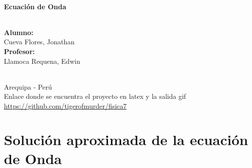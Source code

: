 \documentclass{article}
\begin{document}
\begin{titlepage}
\HRule \\[0.3cm]
{\huge \bfseries Ecuación de Onda}\\[0.3cm]
\HRule \\[0.3cm]

\begin{minipage}{0.7\textwidth}
    \begin{flushleft} 
        \Large{\textbf{Alumno:}}\\[0.3cm]
        {\Large{Cueva Flores, Jonathan}}\\[0.5cm]
        \Large{\textbf{Profesor:}}\\[0.3cm]
    {\LARGE{Llamoca Requena, Edwin}}\\[0.5cm]
    \end{flushleft}

\end{minipage}\\[1cm]

{\Large Arequipa - Perú}\\[1.2cm] 
\vfill 
{\Large Enlace donde se encuentra el proyecto en latex y la salida gif}
{\Large \url{https://github.com/tigerofmurder/fisica7}}
\end{titlepage}
\section{Solución aproximada de la ecuación de Onda}
\end{document}
